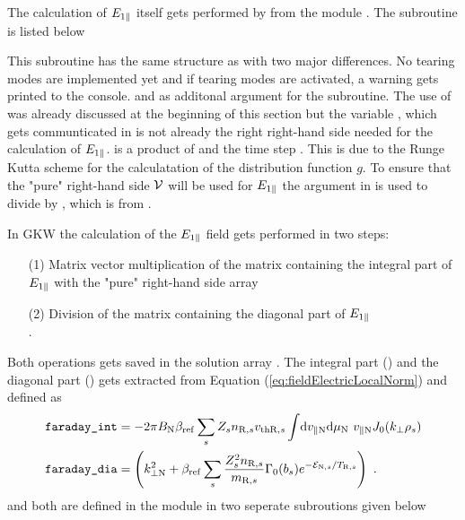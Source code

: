 The calculation of $E_{1\parallel}$ itself gets performed by  from the module . The subroutine is listed below



This subroutine has the same structure as  with two major differences.
No tearing modes are implemented yet and if tearing modes are activated, a warning gets printed to the console.  and  as additonal argument for the subroutine. The use of  was already discussed at the beginning of this section but the variable , which gets communticated in  is not already the right right-hand side needed for the calculation of $E_{1\parallel}$.  is a product of  and the time step . This is due to the Runge Kutta scheme for the calculatation of the distribution function $g$. To ensure that the "pure" right-hand side $\mathcal{V}$ will be used for $E_{1\parallel}$ the argument  in  is used to divide  by , which is  from . \bigskip

In GKW the calculation of the $E_{1\parallel}$ field gets performed in two steps:
\begin{enumerate}
    \item [(1)] Matrix vector multiplication of the matrix containing the integral part of $E_{1\parallel}$ with the "pure" right-hand side array  \\
    \item [(2)] Division of the matrix containing the diagonal part of $E_{1\parallel}$ \\
                .
\end{enumerate}
Both operations gets saved in the solution array . The integral part () and the diagonal part () gets extracted from Equation (\ref{eq:fieldElectricLocalNorm}) and defined as
\begin{gather}
    \begin{aligned}
        \texttt{faraday\_int} &= - 2\pi B_\mathrm{N} \beta_\mathrm{ref} \sum_s Z_s n_{\mathrm{R},s} v_{\mathrm{th}\mathrm{R},s} \int \! \mathrm{d}v_{\parallel \mathrm{N}} \mathrm{d}\mu_\mathrm{N} ~ v_{\parallel \mathrm{N}} J_0(k_\perp \rho_s)\\
        \texttt{faraday\_dia} &= \left(k_{\perp \mathrm{N}}^2 + \beta_\mathrm{ref} \sum_s \frac{Z^2_sn_{\mathrm{R},s}}{m_{\mathrm{R},s}} \Gamma_0(b_s) e^{-\mathcal{E}_{\mathrm{N},s}/T_{\mathrm{R},s}} \right)~.
    \end{aligned}
\end{gather}
 and  both are defined in the module  in two seperate subroutions given below

